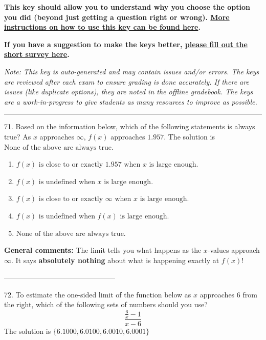 \documentclass{extbook}[14pt]
\begin{document}
\textbf{This key should allow you to understand why you choose the option you did (beyond just getting a question right or wrong). \href{https://xronos.clas.ufl.edu/mac1105spring2020/courseDescriptionAndMisc/Exams/LearningFromResults}{More instructions on how to use this key can be found here}.}

\textbf{If you have a suggestion to make the keys better, \href{https://forms.gle/CZkbZmPbC9XALEE88}{please fill out the short survey here}.}

\textit{Note: This key is auto-generated and may contain issues and/or errors. The keys are reviewed after each exam to ensure grading is done accurately. If there are issues (like duplicate options), they are noted in the offline gradebook. The keys are a work-in-progress to give students as many resources to improve as possible.}

\rule{\textwidth}{0.4pt}

71. Based on the information below, which of the following statements is always true?
As $x$ approaches $\infty$, $f(x)$ approaches $1.957$. 
The solution is $ \text{None of the above are always true.} $ 

\begin{enumerate}[label=\Alph*.] 
\item $ f(x) \text{ is close to or exactly } 1.957 \text{ when } x \text{ is large enough}. $ 

  
\item $ f(x) \text{ is undefined when } x \text{ is large enough}. $ 

  
\item $ f(x) \text{ is close to or exactly } \infty \text{ when } x \text{ is large enough}. $ 

  
\item $ f(x) \text{ is undefined when } f(x) \text{ is large enough}. $ 

  
\item $ \text{None of the above are always true.} $ 

  
\end{enumerate} 
 
\textbf{General comments:} The limit tells you what happens as the $x$-values approach $\infty$. It says \textbf{absolutely nothing} about what is happening exactly at $f(x)$!

-----------------------------------------------

72. To estimate the one-sided limit of the function below as $x$ approaches 6 from the right, which of the following sets of numbers should you use?
\[ \frac{\frac{6}{x} - 1}{x - 6} \] 
The solution is $ \{ 6.1000, 6.0100, 6.0010, 6.0001 \} $ 
\end{document}
